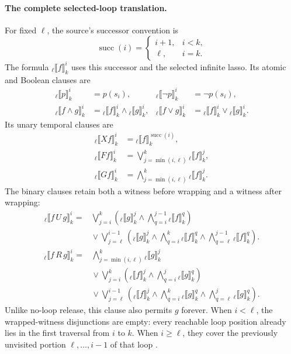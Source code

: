 \paragraph{The complete selected-loop translation.}
For fixed \(\ell\), the source's successor convention is
\[
 \operatorname{succ}(i)=
 \begin{cases}i+1,&i<k,\\ \ell,&i=k.\end{cases}
\]
The formula \({}_\ell\llbracket f\rrbracket_k^i\) uses this successor and
the selected infinite lasso. Its atomic and Boolean clauses are
\[
\begin{aligned}
 {}_\ell\llbracket p\rrbracket_k^i&=p(s_i),&
 {}_\ell\llbracket\neg p\rrbracket_k^i&=\neg p(s_i),\\
 {}_\ell\llbracket f\land g\rrbracket_k^i
  &={}_\ell\llbracket f\rrbracket_k^i
     \land{}_\ell\llbracket g\rrbracket_k^i,&
 {}_\ell\llbracket f\lor g\rrbracket_k^i
  &={}_\ell\llbracket f\rrbracket_k^i
     \lor{}_\ell\llbracket g\rrbracket_k^i.
\end{aligned}
\]
Its unary temporal clauses are
\[
\begin{aligned}
 {}_\ell\llbracket Xf\rrbracket_k^i
   &={}_\ell\llbracket f\rrbracket_k^{\operatorname{succ}(i)},\\
 {}_\ell\llbracket Ff\rrbracket_k^i
   &=\bigvee_{j=\min(i,\ell)}^{k}{}_\ell\llbracket f\rrbracket_k^j,\\
 {}_\ell\llbracket Gf\rrbracket_k^i
   &=\bigwedge_{j=\min(i,\ell)}^{k}{}_\ell\llbracket f\rrbracket_k^j.
\end{aligned}
\]
The binary clauses retain both a witness before wrapping and a witness after
wrapping:
\[
\begin{split}
 {}_\ell\llbracket f\,U\,g\rrbracket_k^i
 ={}&
 \bigvee_{j=i}^{k}
   \left({}_\ell\llbracket g\rrbracket_k^j\land
         \bigwedge_{q=i}^{j-1}{}_\ell\llbracket f\rrbracket_k^q\right)\\
 &{}\lor
 \bigvee_{j=\ell}^{i-1}
   \left({}_\ell\llbracket g\rrbracket_k^j\land
         \bigwedge_{q=i}^{k}{}_\ell\llbracket f\rrbracket_k^q\land
         \bigwedge_{q=\ell}^{j-1}{}_\ell\llbracket f\rrbracket_k^q\right).
\end{split}
\]
\[
\begin{split}
 {}_\ell\llbracket f\,R\,g\rrbracket_k^i
 ={}&
 \bigwedge_{j=\min(i,\ell)}^{k}{}_\ell\llbracket g\rrbracket_k^j\\
 &{}\lor
 \bigvee_{j=i}^{k}
   \left({}_\ell\llbracket f\rrbracket_k^j\land
         \bigwedge_{q=i}^{j}{}_\ell\llbracket g\rrbracket_k^q\right)\\
 &{}\lor
 \bigvee_{j=\ell}^{i-1}
   \left({}_\ell\llbracket f\rrbracket_k^j\land
         \bigwedge_{q=i}^{k}{}_\ell\llbracket g\rrbracket_k^q\land
         \bigwedge_{q=\ell}^{j}{}_\ell\llbracket g\rrbracket_k^q\right).
\end{split}
\]
Unlike no-loop release, this clause also permits \(g\) forever.
When \(i<\ell\), the wrapped-witness disjunctions are empty: every reachable
loop position already lies in the first traversal from \(i\) to \(k\).
When \(i\geq\ell\), they cover the previously unvisited portion
\(\ell,\ldots,i-1\) of that loop \cite[defs.~12--13]{BiereCimattiClarkeZhu1999}.

